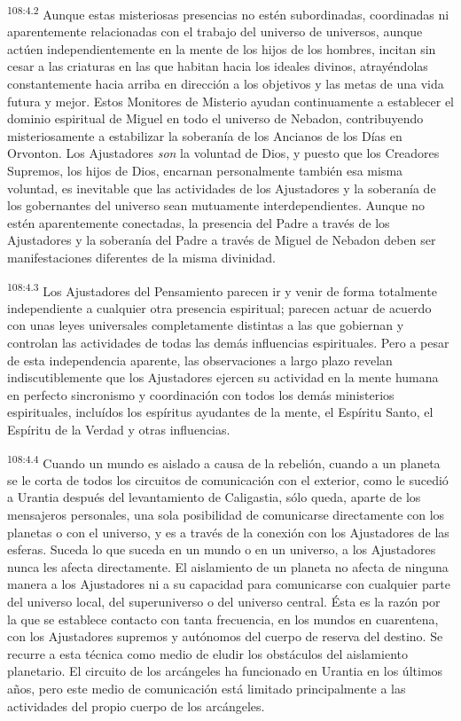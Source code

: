 \documentclass[twoside, 11pt]{book}
\begin{document}
\par
\textsuperscript{108:4.2} Aunque estas misteriosas presencias no estén subordinadas, coordinadas ni aparentemente relacionadas con el trabajo del universo de universos, aunque actúen independientemente en la mente de los hijos de los hombres, incitan sin cesar a las criaturas en las que habitan hacia los ideales divinos, atrayéndolas constantemente hacia arriba en dirección a los objetivos y las metas de una vida futura y mejor. Estos Monitores de Misterio ayudan continuamente a establecer el dominio espiritual de Miguel en todo el universo de Nebadon, contribuyendo misteriosamente a estabilizar la soberanía de los Ancianos de los Días en Orvonton. Los Ajustadores \textit{son} la voluntad de Dios, y puesto que los Creadores Supremos, los hijos de Dios, encarnan personalmente también esa misma voluntad, es inevitable que las actividades de los Ajustadores y la soberanía de los gobernantes del universo sean mutuamente interdependientes. Aunque no estén aparentemente conectadas, la presencia del Padre a través de los Ajustadores y la soberanía del Padre a través de Miguel de Nebadon deben ser manifestaciones diferentes de la misma divinidad.

\par
\textsuperscript{108:4.3} Los Ajustadores del Pensamiento parecen ir y venir de forma totalmente independiente a cualquier otra presencia espiritual; parecen actuar de acuerdo con unas leyes universales completamente distintas a las que gobiernan y controlan las actividades de todas las demás influencias espirituales. Pero a pesar de esta independencia aparente, las observaciones a largo plazo revelan indiscutiblemente que los Ajustadores ejercen su actividad en la mente humana en perfecto sincronismo y coordinación con todos los demás ministerios espirituales, incluídos los espíritus ayudantes de la mente, el Espíritu Santo, el Espíritu de la Verdad y otras influencias.

\par
\textsuperscript{108:4.4} Cuando un mundo es aislado a causa de la rebelión, cuando a un planeta se le corta de todos los circuitos de comunicación con el exterior, como le sucedió a Urantia después del levantamiento de Caligastia, sólo queda, aparte de los mensajeros personales, una sola posibilidad de comunicarse directamente con los planetas o con el universo, y es a través de la conexión con los Ajustadores de las esferas. Suceda lo que suceda en un mundo o en un universo, a los Ajustadores nunca les afecta directamente. El aislamiento de un planeta no afecta de ninguna manera a los Ajustadores ni a su capacidad para comunicarse con cualquier parte del universo local, del superuniverso o del universo central. Ésta es la razón por la que se establece contacto con tanta frecuencia, en los mundos en cuarentena, con los Ajustadores supremos y autónomos del cuerpo de reserva del destino. Se recurre a esta técnica como medio de eludir los obstáculos del aislamiento planetario. El circuito de los arcángeles ha funcionado en Urantia en los últimos años, pero este medio de comunicación está limitado principalmente a las actividades del propio cuerpo de los arcángeles.
\end{document}
